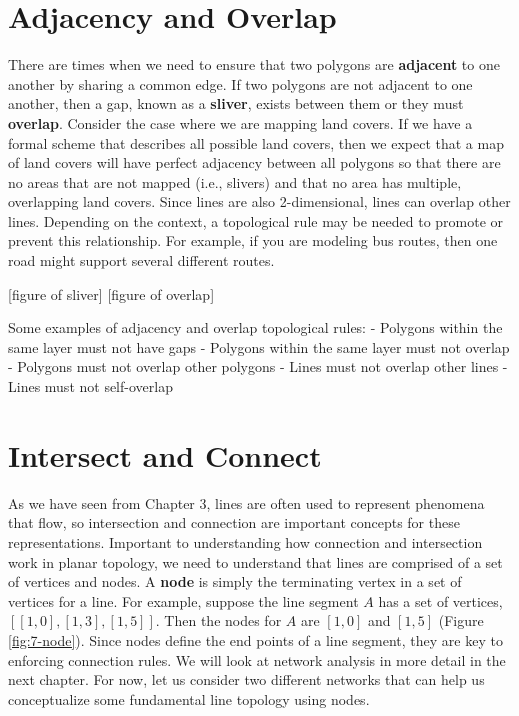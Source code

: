 \documentclass[
]{book}
\begin{document}
\hypertarget{adjacency-and-overlap}{%
\section{Adjacency and Overlap}\label{adjacency-and-overlap}}

There are times when we need to ensure that two polygons are \textbf{adjacent} to one another by sharing a common edge. If two polygons are not adjacent to one another, then a gap, known as a \textbf{sliver}, exists between them or they must \textbf{overlap}. Consider the case where we are mapping land covers. If we have a formal scheme that describes all possible land covers, then we expect that a map of land covers will have perfect adjacency between all polygons so that there are no areas that are not mapped (i.e., slivers) and that no area has multiple, overlapping land covers. Since lines are also 2-dimensional, lines can overlap other lines. Depending on the context, a topological rule may be needed to promote or prevent this relationship. For example, if you are modeling bus routes, then one road might support several different routes.

{[}figure of sliver{]}
{[}figure of overlap{]}

Some examples of adjacency and overlap topological rules:
- Polygons within the same layer must not have gaps
- Polygons within the same layer must not overlap
- Polygons must not overlap other polygons
- Lines must not overlap other lines
- Lines must not self-overlap

\hypertarget{intersect-and-connect}{%
\section{Intersect and Connect}\label{intersect-and-connect}}

As we have seen from Chapter 3, lines are often used to represent phenomena that flow, so intersection and connection are important concepts for these representations. Important to understanding how connection and intersection work in planar topology, we need to understand that lines are comprised of a set of vertices and nodes. A \textbf{node} is simply the terminating vertex in a set of vertices for a line. For example, suppose the line segment \(A\) has a set of vertices, \([[1,0],[1,3],[1,5]]\). Then the nodes for \(A\) are \([1,0]\) and \([1,5]\) (Figure \ref{fig:7-node}). Since nodes define the end points of a line segment, they are key to enforcing connection rules. We will look at network analysis in more detail in the next chapter. For now, let us consider two different networks that can help us conceptualize some fundamental line topology using nodes.
\end{document}
